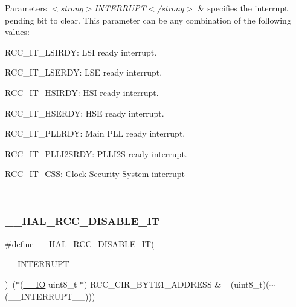 \begin{DoxyParams}{Parameters}
{\em $<$strong$>$\+I\+N\+T\+E\+R\+R\+U\+P\+T$<$/strong$>$} & specifies the interrupt pending bit to clear. This parameter can be any combination of the following values\+: \begin{DoxyItemize}
\item R\+C\+C\+\_\+\+I\+T\+\_\+\+L\+S\+I\+R\+DY\+: L\+SI ready interrupt. \item R\+C\+C\+\_\+\+I\+T\+\_\+\+L\+S\+E\+R\+DY\+: L\+SE ready interrupt. \item R\+C\+C\+\_\+\+I\+T\+\_\+\+H\+S\+I\+R\+DY\+: H\+SI ready interrupt. \item R\+C\+C\+\_\+\+I\+T\+\_\+\+H\+S\+E\+R\+DY\+: H\+SE ready interrupt. \item R\+C\+C\+\_\+\+I\+T\+\_\+\+P\+L\+L\+R\+DY\+: Main P\+LL ready interrupt. \item R\+C\+C\+\_\+\+I\+T\+\_\+\+P\+L\+L\+I2\+S\+R\+DY\+: P\+L\+L\+I2S ready interrupt.\end{DoxyItemize}
\begin{DoxyItemize}
\item R\+C\+C\+\_\+\+I\+T\+\_\+\+C\+SS\+: Clock Security System interrupt \end{DoxyItemize}
\\
\hline
\end{DoxyParams}
\mbox{\label{group___r_c_c___flags___interrupts___management_gafc4df8cd4df0a529d11f18bf1f7e9f50}} 
\subsubsection{\texorpdfstring{\_\_HAL\_RCC\_DISABLE\_IT}{\_\_HAL\_RCC\_DISABLE\_IT}}
{\footnotesize\ttfamily \#define \+\_\+\+\_\+\+H\+A\+L\+\_\+\+R\+C\+C\+\_\+\+D\+I\+S\+A\+B\+L\+E\+\_\+\+IT(\begin{DoxyParamCaption}\item[{}]{\+\_\+\+\_\+\+I\+N\+T\+E\+R\+R\+U\+P\+T\+\_\+\+\_\+ }\end{DoxyParamCaption})~($\ast$(\mbox{\hyperlink{core__sc300_8h_aec43007d9998a0a0e01faede4133d6be}{\+\_\+\+\_\+\+IO}} uint8\+\_\+t $\ast$) R\+C\+C\+\_\+\+C\+I\+R\+\_\+\+B\+Y\+T\+E1\+\_\+\+A\+D\+D\+R\+E\+SS \&= (uint8\+\_\+t)($\sim$(\+\_\+\+\_\+\+I\+N\+T\+E\+R\+R\+U\+P\+T\+\_\+\+\_\+)))}



